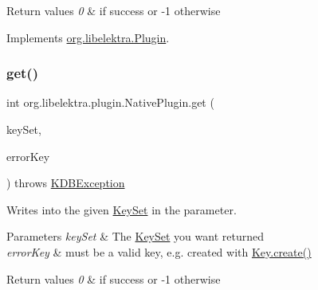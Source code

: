 \begin{DoxyRetVals}{Return values}
{\em 0} & if success or -\/1 otherwise \\
\hline
\end{DoxyRetVals}


Implements \hyperlink{interfaceorg_1_1libelektra_1_1Plugin_aa91370570c862ebe9eb83094a4731b9a}{org.\+libelektra.\+Plugin}.

\mbox{\label{classorg_1_1libelektra_1_1plugin_1_1NativePlugin_a766870e5f26cab4d497ed7c2fbc4abd9}} 
\subsubsection{\texorpdfstring{get()}{get()}}
{\footnotesize\ttfamily int org.\+libelektra.\+plugin.\+Native\+Plugin.\+get (\begin{DoxyParamCaption}\item[{\hyperlink{classorg_1_1libelektra_1_1KeySet}{Key\+Set}}]{key\+Set,  }\item[{\hyperlink{classorg_1_1libelektra_1_1Key}{Key}}]{error\+Key }\end{DoxyParamCaption}) throws \hyperlink{classorg_1_1libelektra_1_1exception_1_1KDBException}{K\+D\+B\+Exception}\hspace{0.3cm}{\ttfamily [inline]}}



Writes into the given \hyperlink{classorg_1_1libelektra_1_1KeySet}{Key\+Set} in the parameter. 


\begin{DoxyParams}{Parameters}
{\em key\+Set} & The \hyperlink{classorg_1_1libelektra_1_1KeySet}{Key\+Set} you want returned \\
\hline
{\em error\+Key} & must be a valid key, e.\+g. created with \hyperlink{classorg_1_1libelektra_1_1Key_af407cf43625618af4e7fb2576037fcfc}{Key.\+create()} \\
\hline
\end{DoxyParams}

\begin{DoxyRetVals}{Return values}
{\em 0} & if success or -\/1 otherwise \\
\hline
\end{DoxyRetVals}

